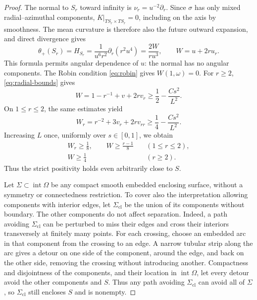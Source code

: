 \begin{proof}
The normal to $S_r$ toward infinity is $\nu_r=u^{-2}\partial_r$.  Since
$\sigma$ has only mixed radial--azimuthal components,
$K|_{TS_r\times TS_r}=0$, including on the axis by smoothness.  The mean
curvature is therefore also the future outward expansion, and direct
divergence gives
\begin{equation}\label{eq:sphere-expansion}
 \theta_+(S_r)=H_{S_r}
 =\frac{1}{u^6r^2}\partial_r(r^2u^4)
 =\frac{2W}{ru^3},\qquad W=u+2ru_r.
\end{equation}
This formula permits angular dependence of $u$: the normal has no angular
components.  The Robin condition \eqref{eq:robin} gives $W(1,\omega)=0$.
For $r\ge2$, \eqref{eq:radial-bounds} gives
\[
 W=1-r^{-1}+v+2rv_r\ge\frac12-\frac{Cs^2}{L^2}.
\]
On $1\le r\le2$, the same estimates yield
\[
 W_r=r^{-2}+3v_r+2rv_{rr}\ge\frac14-\frac{Cs^2}{L^2}.
\]
Increasing $L$ once, uniformly over $s\in[0,1]$, we obtain
\begin{equation}\label{eq:positive-W}
 \begin{aligned}
 W_r\ge\frac18,\qquad W\ge\frac{r-1}{8}
     &\quad(1\le r\le2),\\
 W\ge\frac14&\quad(r\ge2).
 \end{aligned}
\end{equation}
Thus the strict positivity holds even arbitrarily close to $S$.

Let $\Sigma\subset\operatorname{int}\Omega$ be any compact smooth embedded
enclosing surface, without a symmetry or connectedness restriction.  To
cover also the interpretation allowing components with interior edges, let
$\Sigma_{\mathrm{cl}}$ be the union of its components without boundary.
The other components do not affect separation.  Indeed, a path avoiding
$\Sigma_{\mathrm{cl}}$ can be perturbed to miss their edges and cross their
interiors transversely at finitely many points.  For each crossing, choose
an embedded arc in that component from the crossing to an edge.  A narrow
tubular strip along the arc gives a detour on one side of the component,
around the edge, and back on the other side, removing the crossing without
introducing another.  Compactness and disjointness of the components, and
their location in $\operatorname{int}\Omega$, let every detour avoid the
other components and $S$.  Thus any path avoiding $\Sigma_{\mathrm{cl}}$
can avoid all of $\Sigma$, so $\Sigma_{\mathrm{cl}}$ still encloses $S$
and is nonempty.


\end{proof}
